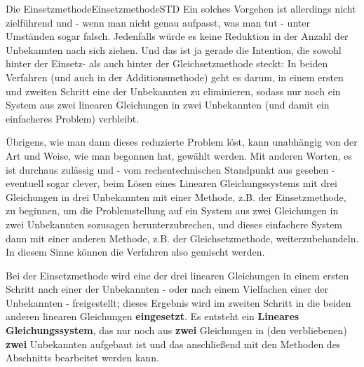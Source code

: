 \begin{MXContent}{Die Einsetzmethode}{Einsetzmethode}{STD}
Ein solches Vorgehen ist allerdings nicht
zielführend und - wenn man nicht genau aufpasst, was man tut - unter Umständen sogar falsch. Jedenfalls würde es
keine Reduktion in der Anzahl der Unbekannten nach sich ziehen. Und das ist ja gerade die Intention, die sowohl
hinter der Einsetz- als auch hinter der Gleichsetzmethode steckt: In beiden Verfahren (und
auch in der Additionsmethode) geht es darum, in einem ersten und zweiten Schritt eine der Unbekannten
zu eliminieren, sodass nur noch ein System aus zwei linearen Gleichungen in zwei Unbekannten (und damit ein
einfacheres Problem) verbleibt.

Übrigens, wie man dann dieses reduzierte Problem löst, kann unabhängig von der Art und Weise,
wie man begonnen hat, gewählt werden.
Mit anderen Worten, es ist durchaus zulässig und - vom rechentechnischen Standpunkt aus gesehen - eventuell
sogar clever, beim Lösen eines Linearen Gleichungssystems
mit drei Gleichungen in drei Unbekannten mit einer Methode, z.B. der Einsetzmethode, zu beginnen,
um die Problemstellung auf ein
System aus zwei Gleichungen in zwei Unbekannten sozusagen \glqq herunterzubrechen{\grqq},
und dieses einfachere System dann mit einer anderen Methode, z.B. der
Gleichsetzmethode, weiterzubehandeln. In diesem Sinne können die Verfahren also gemischt werden.
\begin{MInfo}
Bei der Einsetzmethode wird eine der drei linearen Gleichungen in einem ersten Schritt
nach einer der Unbekannten - oder nach einem Vielfachen einer der Unbekannten - freigestellt; dieses Ergebnis wird im
zweiten Schritt in die beiden anderen linearen Gleichungen \textbf{eingesetzt}. Es entsteht ein \textbf{Lineares
Gleichungssystem}, das nur noch aus \textbf{zwei} Gleichungen in (den verbliebenen) \textbf{zwei} Unbekannten
aufgebaut ist und das anschließend mit den Methoden des Abschnitts  bearbeitet werden kann.
\end{MInfo}
\end{MXContent}

